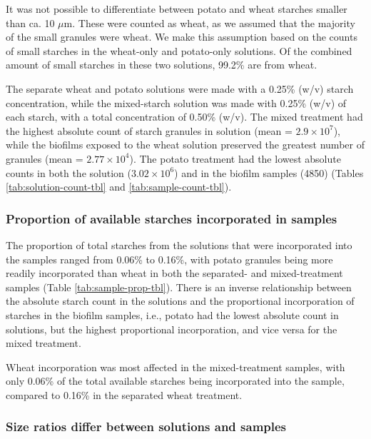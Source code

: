 \documentclass[utf8]{../templates/frontiersSCNS}
\begin{document}
It was not possible to differentiate between potato and
wheat starches smaller than ca. 10 \(\mu\)m. These were counted as wheat,
as we assumed that the majority of the small granules were wheat. We make this
assumption based on the counts of small starches in the wheat-only and potato-only
solutions. Of the combined amount of small starches in these two solutions,
99.2\%
are from wheat.

The separate wheat and potato solutions were made with a 0.25\% (w/v) starch
concentration, while the mixed-starch solution was made with 0.25\% (w/v) of each
starch, with a total concentration of 0.50\% (w/v).
The mixed treatment had the highest absolute count of starch granules in solution (mean = \ensuremath{2.9\times 10^{7}}),
while the biofilms exposed to the wheat solution preserved the greatest number of
granules
(mean = \ensuremath{2.77\times 10^{4}}).
The potato treatment had the lowest absolute counts in both the solution
(\ensuremath{3.02\times 10^{6}})
and in the biofilm samples
(4850)
(Tables \ref{tab:solution-count-tbl} and \ref{tab:sample-count-tbl}).

\hypertarget{proportion-of-available-starches-incorporated-in-samples}{%
\subsubsection{Proportion of available starches incorporated in samples}\label{proportion-of-available-starches-incorporated-in-samples}}

The proportion of total starches from the solutions that were incorporated
into the samples ranged from
0.06\% to 0.16\%,
with potato granules being more readily incorporated than wheat in both the
separated- and mixed-treatment samples
(Table \ref{tab:sample-prop-tbl}).
There is an inverse relationship between the absolute starch count in the solutions
and the proportional incorporation of starches in the biofilm samples, i.e., potato
had the lowest absolute count in solutions, but the highest proportional
incorporation, and vice versa for the mixed treatment.

Wheat incorporation was most affected in the mixed-treatment samples, with only
0.06\% of the total available starches being incorporated into
the sample, compared to
0.16\%
in the separated wheat treatment.

\hypertarget{size-ratios-differ-between-solutions-and-samples}{%
\subsubsection{Size ratios differ between solutions and samples}\label{size-ratios-differ-between-solutions-and-samples}}
\end{document}
